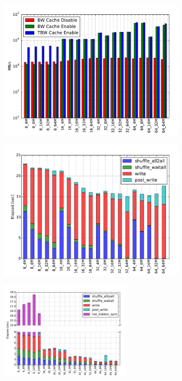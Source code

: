 \begin{figure}[]
  \centering
  \begin{subfigure}[]{0.7\textwidth}
  \centering
  \includegraphics[width=\textwidth]{figures/flash_32GB_30sec_bw}
  \caption{}
  \label{figure: flash-bw}
  \end{subfigure}
  \begin{subfigure}[]{0.7\textwidth}
  \centering
  \includegraphics[width=\textwidth]{figures/flash_32GB_30sec_elapsed_disable}
  \caption{}
  \label{figure: flash-elaps-disable}
  \end{subfigure}
  \begin{subfigure}[]{\textwidth}
  \centering
  \includegraphics[width=0.7\textwidth]{figures/flash_32GB_30sec_elapsed_enable}

\end{subfigure}
\end{figure}
